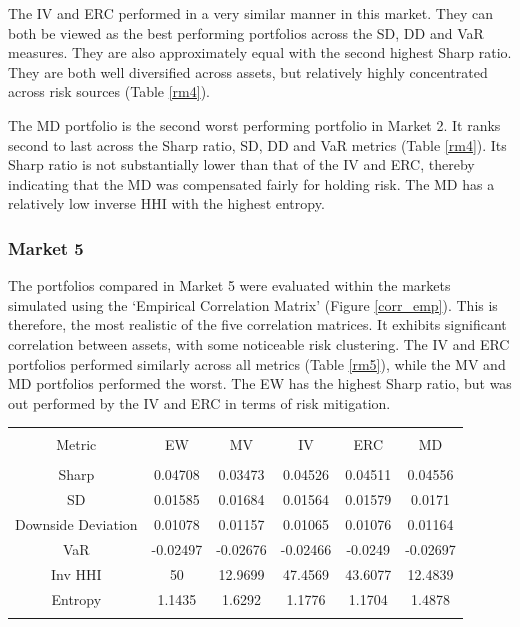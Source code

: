 \documentclass[11pt,preprint, authoryear]{elsarticle}
\let\origtable\table
\let\endorigtable\endtable
\renewenvironment{table}[1][2] {
    \expandafter\origtable\expandafter[H]
} {
    \endorigtable
}
\numberwithin{equation}{section}
\numberwithin{figure}{section}
\numberwithin{table}{section}
\begin{document}
The IV and ERC performed in a very similar manner in this market. They
can both be viewed as the best performing portfolios across the SD, DD
and VaR measures. They are also approximately equal with the second
highest Sharp ratio. They are both well diversified across assets, but
relatively highly concentrated across risk sources (Table \ref{rm4}).

The MD portfolio is the second worst performing portfolio in Market 2.
It ranks second to last across the Sharp ratio, SD, DD and VaR metrics
(Table \ref{rm4}). Its Sharp ratio is not substantially lower than that
of the IV and ERC, thereby indicating that the MD was compensated fairly
for holding risk. The MD has a relatively low inverse HHI with the
highest entropy.

\hypertarget{market-5}{%
\subsubsection{Market 5}\label{market-5}}

The portfolios compared in Market 5 were evaluated within the markets
simulated using the `Empirical Correlation Matrix' (Figure
\ref{corr_emp}). This is therefore, the most realistic of the five
correlation matrices. It exhibits significant correlation between
assets, with some noticeable risk clustering. The IV and ERC portfolios
performed similarly across all metrics (Table \ref{rm5}), while the MV
and MD portfolios performed the worst. The EW has the highest Sharp
ratio, but was out performed by the IV and ERC in terms of risk
mitigation.

\begin{table}[!htbp] \centering 
  \caption{Market 5 - Portfolio Risk Metrics} 
  \label{rm5} 
\begin{tabular}{@{\extracolsep{5pt}} cccccc} 
\\[-1.8ex]\hline 
\hline \\[-1.8ex] 
Metric & EW & MV & IV & ERC & MD \\ 
\hline \\[-1.8ex] 
Sharp & 0.04708 & 0.03473 & 0.04526 & 0.04511 & 0.04556 \\ 
SD & 0.01585 & 0.01684 & 0.01564 & 0.01579 & 0.0171 \\ 
Downside Deviation & 0.01078 & 0.01157 & 0.01065 & 0.01076 & 0.01164 \\ 
VaR & -0.02497 & -0.02676 & -0.02466 & -0.0249 & -0.02697 \\ 
Inv HHI & 50 & 12.9699 & 47.4569 & 43.6077 & 12.4839 \\ 
Entropy & 1.1435 & 1.6292 & 1.1776 & 1.1704 & 1.4878 \\ 
\hline \\[-1.8ex] 
\end{tabular} 
\end{table}
\end{document}
